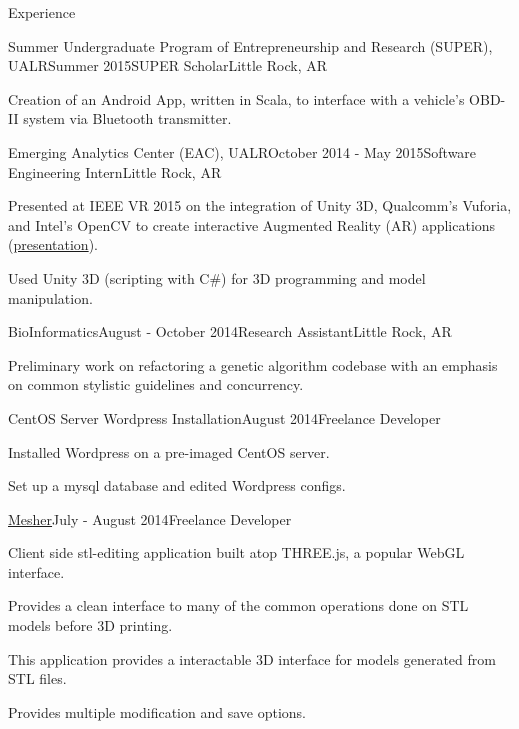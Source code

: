\documentclass{resume} %
\begin{document}
\begin{rSection}{Experience}

\begin{rSubsection}{Summer Undergraduate Program of Entrepreneurship and Research (SUPER), \\
	UALR}{Summer 2015}{SUPER Scholar}{Little Rock, AR}
	\item Creation of an Android App, written in Scala, to interface with a vehicle's OBD-II system via Bluetooth transmitter.
\end{rSubsection}

\begin{rSubsection}{Emerging Analytics Center (EAC), UALR}{October 2014 - May 2015}{Software Engineering Intern}{Little Rock, AR}
	\item Presented at IEEE VR 2015 on the integration of Unity 3D, Qualcomm's Vuforia, and Intel's OpenCV to create interactive Augmented Reality (AR) applications (\href{http://byteflame.org/ieee_vr/}{presentation}{}).
	\item Used Unity 3D (scripting with C\#) for 3D programming and model manipulation.
\end{rSubsection}

\begin{rSubsection}{BioInformatics}{August - October 2014}{Research Assistant}{Little Rock, AR}

	\item Preliminary work on refactoring a genetic algorithm codebase with an emphasis on common stylistic guidelines and concurrency.
\end{rSubsection}

\begin{rSubsection}{CentOS Server Wordpress Installation}{August 2014}{Freelance Developer}{}

	\item Installed Wordpress on a pre-imaged CentOS server.
	\item Set up a mysql database and edited Wordpress configs.
\end{rSubsection}

\begin{rSubsection}{\href{http://github.com/cptaffe/Mesher}{Mesher}}{July - August 2014}{Freelance Developer}{}

	\item Client side stl-editing application built atop THREE.js, a popular WebGL interface.
	\item Provides a clean interface to many of the common operations done on STL models before 3D printing.
	\item This application provides a interactable 3D interface for models generated from STL files.
	\item Provides multiple modification and save options.
\end{rSubsection}


\end{rSection}
\end{document}
